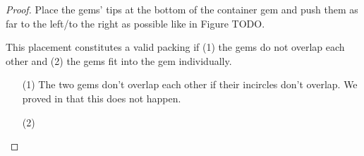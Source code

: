 \documentclass[a4paper,style=print,bibliography=totoc,nexus,lnum,extramargin]{tubsbook}
\begin{document}
\begin{proof}
    Place the gems' tips at the bottom of the container gem and push them as far to the left/to the right as possible like in Figure TODO.

    This placement constitutes a valid packing if (1) the gems do not overlap each other and (2) the gems fit into the gem individually.

    \begin{itemize}
        \item[(1)]
            The two gems don't overlap each other if their incircles don't overlap. We proved in  that this does not happen.
        \item[(2)]

    \end{itemize}
\end{proof}
\end{document}
